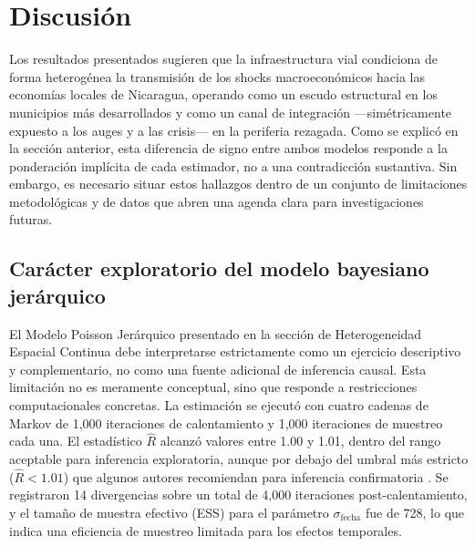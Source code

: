 \documentclass[
  spanish,
  12pt,
  letterpaper]{article}
\begin{document}
\section{Discusión}\label{sec-discusion}

Los resultados presentados sugieren que la infraestructura vial
condiciona de forma heterogénea la transmisión de los shocks
macroeconómicos hacia las economías locales de Nicaragua, operando como
un escudo estructural en los municipios más desarrollados y como un
canal de integración ---simétricamente expuesto a los auges y a las
crisis--- en la periferia rezagada. Como se explicó en la sección
anterior, esta diferencia de signo entre ambos modelos responde a la
ponderación implícita de cada estimador, no a una contradicción
sustantiva. Sin embargo, es necesario situar estos hallazgos dentro de
un conjunto de limitaciones metodológicas y de datos que abren una
agenda clara para investigaciones futuras.

\subsection{Carácter exploratorio del modelo bayesiano
jerárquico}\label{caruxe1cter-exploratorio-del-modelo-bayesiano-jeruxe1rquico}

El Modelo Poisson Jerárquico presentado en la sección de Heterogeneidad
Espacial Continua debe interpretarse estrictamente como un ejercicio
descriptivo y complementario, no como una fuente adicional de inferencia
causal. Esta limitación no es meramente conceptual, sino que responde a
restricciones computacionales concretas. La estimación se ejecutó con
cuatro cadenas de Markov de 1,000 iteraciones de calentamiento y 1,000
iteraciones de muestreo cada una. El estadístico \(\hat{R}\) alcanzó
valores entre 1.00 y 1.01, dentro del rango aceptable para inferencia
exploratoria, aunque por debajo del umbral más estricto
(\(\hat{R} < 1.01\)) que algunos autores recomiendan para inferencia
confirmatoria \parencite{gelman2006data}. Se registraron 14 divergencias
sobre un total de 4,000 iteraciones post-calentamiento, y el tamaño de
muestra efectivo (ESS) para el parámetro \(\sigma_{\text{fecha}}\) fue
de 728, lo que indica una eficiencia de muestreo limitada para los
efectos temporales.
\end{document}
